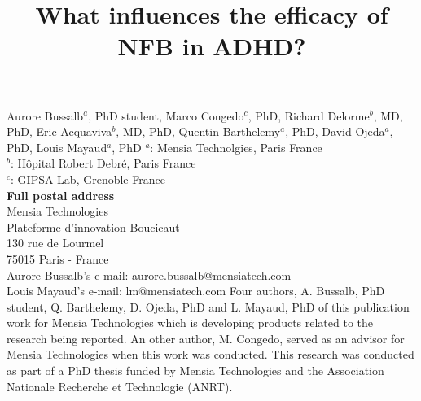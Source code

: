

\title{What influences the efficacy of NFB in ADHD?} %
\maketitle
\noindent Aurore Bussalb$^a$, PhD student, Marco Congedo$^c$, PhD, Richard Delorme$^b$, MD, PhD, Eric Acquaviva$^b$, MD, PhD,
Quentin Barthelemy$^a$, PhD, David Ojeda$^a$, PhD, Louis Mayaud$^a$, PhD 
\smallbreak
\noindent $^a$: Mensia Technolgies, Paris France \\
\noindent $^b$: Hôpital Robert Debré, Paris France \\ %
\noindent $^c$: GIPSA-Lab, Grenoble France \\
\smallbreak
\noindent\textbf{Full postal address} \\
Mensia Technologies \\
Plateforme d'innovation Boucicaut \\
130 rue de Lourmel \\
75015 Paris - France \\
Aurore Bussalb's e-mail: aurore.bussalb@mensiatech.com \\
Louis Mayaud's e-mail: lm@mensiatech.com 
\smallbreak
Four authors, A. Bussalb, PhD student, Q. Barthelemy, D. Ojeda, PhD and L. Mayaud, PhD of this publication work for Mensia Technologies which is developing products related to the research being reported.
An other author, M. Congedo, served as an advisor for Mensia Technologies when this work was conducted. 
\smallbreak
This research was conducted as part of a PhD thesis funded by Mensia Technologies and the Association Nationale Recherche et Technologie (ANRT).
